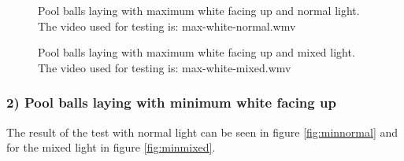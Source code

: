 \begin{figure}[H]
  \centering
  \quad
	\quad
   \caption{Pool balls laying with maximum white facing up and normal light. The video used for testing is: max-white-normal.wmv}
  \label{fig:maxnormal}
\end{figure}


\begin{figure}[H]
  \centering
  \quad
  \quad
   \caption{Pool balls laying with maximum white facing up and mixed light. The video used for testing is: max-white-mixed.wmv}
  \label{fig:maxmixed}
\end{figure}


\subsubsection{2) Pool balls laying with minimum white facing up}
The result of the test with normal light can be seen in figure \ref{fig:minnormal} and for the mixed light in figure \ref{fig:minmixed}.

